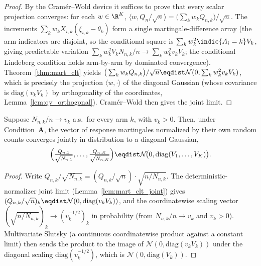 \begin{proof}\leanok
{}
By the Cramér--Wold device it suffices to prove that every scalar projection converges: for each
$w\in\R^K$, $\langle w, Q_n/\sqrt n\rangle = \big(\sum_k w_k Q_{n,k}\big)/\sqrt n$. The increments
$\sum_k w_k X_{i,k}(\xi_{i,k}-\theta_k)$ form a single martingale-difference array (the arm indicators
are disjoint, so the conditional square is $\sum_k w_k^2\indic\{A_i=k\}V_k$, giving predictable
variation $\sum_k w_k^2 V_k N_{n,k}/n\to\sum_k w_k^2 v_kV_k$; the conditional Lindeberg condition
holds arm-by-arm by dominated convergence). Theorem~\ref{thm:mart_clt} yields
$\big(\sum_k w_k Q_{n,k}\big)/\sqrt n\eqdist\mathcal N(0,\sum_k w_k^2 v_kV_k)$, which is precisely the
projection $\langle w,\cdot\rangle$ of the diagonal Gaussian (whose covariance is
$\mathrm{diag}(v_kV_k)$ by orthogonality of the coordinates, Lemma~\ref{lem:qv_orthogonal}). Cramér--Wold
then gives the joint limit.
\end{proof}

\begin{lemma}\label{lem:mart_clt_joint_selfnorm}
\leanok
{}
Suppose $N_{n,k}/n\to v_k$ a.s.\ for every arm $k$, with $v_k>0$. Then, under
Condition~\textbf{A}, the vector of response martingales normalized by their own random counts
converges jointly in distribution to a diagonal Gaussian,
\[
  \Big(\tfrac{Q_{n,1}}{\sqrt{N_{n,1}}},\dots,\tfrac{Q_{n,K}}{\sqrt{N_{n,K}}}\Big)
    \eqdist \mathcal N\!\big(0, \mathrm{diag}(V_1,\dots,V_K)\big).
\]
\end{lemma}

\begin{proof}\leanok
{}
Write $Q_{n,k}/\sqrt{N_{n,k}}=(Q_{n,k}/\sqrt n)\cdot\sqrt{n/N_{n,k}}$. The deterministic-normalizer
joint limit (Lemma~\ref{lem:mart_clt_joint}) gives
$(Q_{n,k}/\sqrt n)_k\eqdist\mathcal N(0,\mathrm{diag}(v_kV_k))$, and the coordinatewise scaling
vector $(\sqrt{n/N_{n,k}})_k\to(v_k^{-1/2})_k$ in probability (from $N_{n,k}/n\to v_k$ and
$v_k>0$). Multivariate Slutsky (a continuous coordinatewise product against a constant limit) then
sends the product to the image of $\mathcal N(0,\mathrm{diag}(v_kV_k))$ under the diagonal scaling
$\mathrm{diag}(v_k^{-1/2})$, which is $\mathcal N(0,\mathrm{diag}(V_k))$.
\end{proof}

